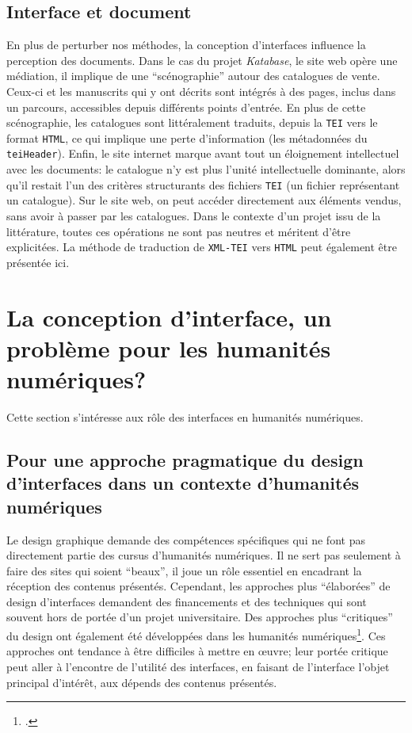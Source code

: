 \documentclass[a4paper, 12pt, twoside]{book}
\newcommand{\html}{\texttt{HTML}}
\newcommand{\ktb}{\textit{Katabase}}
\newcommand{\tei}{\texttt{TEI}}
\newcommand{\xmltei}{\texttt{XML-TEI}}
\begin{document}
\subsection{Interface et document}
En plus de perturber nos méthodes, la conception d'interfaces influence la perception des documents. Dans le cas du projet \ktb, le site web opère une médiation, il implique de une \enquote{scénographie} autour des catalogues de vente. Ceux-ci et les manuscrits qui y ont décrits sont intégrés à des pages, inclus dans un parcours, accessibles depuis différents points d'entrée. En plus de cette scénographie, les catalogues sont littéralement traduits, depuis la \tei{} vers le format \html{}, ce qui implique une perte d'information (les métadonnées du \texttt{teiHeader}). Enfin, le site internet marque avant tout un éloignement intellectuel avec les documents: le catalogue n'y est plus l'unité intellectuelle dominante, alors qu'il restait l'un des critères structurants des fichiers \tei{} (un fichier représentant un catalogue). Sur le site web, on peut accéder directement aux éléments vendus, sans avoir à passer par les catalogues. Dans le contexte d'un projet issu de la littérature, toutes ces opérations ne sont pas neutres et méritent d'être explicitées. La méthode de traduction de \xmltei{} vers \html{} peut également être présentée ici.


\section{La conception d'interface, un problème pour les humanités numériques?}
Cette section s'intéresse aux rôle des interfaces en humanités numériques.

\subsection{Pour une approche pragmatique du design d'interfaces dans un contexte d'humanités numériques}
Le design graphique demande des compétences spécifiques qui ne font pas directement partie des cursus d'humanités numériques. Il ne sert pas seulement à faire des sites qui soient \enquote{beaux}, il joue un rôle essentiel en encadrant la réception des contenus présentés. Cependant, les approches plus \enquote{élaborées} de design d'interfaces demandent des financements et des techniques qui sont souvent hors de portée d'un projet universitaire. Des approches plus \enquote{critiques} du design ont également été développées dans les humanités numériques\footcite{drucker_visualisation_2020}. Ces approches ont tendance à être difficiles à mettre en œuvre; leur portée critique peut aller à l'encontre de l'utilité des interfaces, en faisant de l'interface l'objet principal d'intérêt, aux dépends des contenus présentés. 
\end{document}
